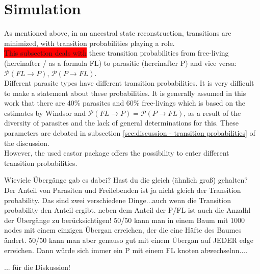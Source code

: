   \section{Simulation} \label{sec:discussion - simulation}

  As mentioned above, in an ancestral state reconstruction, transitions are minimized, with 
  transition probabilities playing a role. \\
\colorbox{red}{This subsection deals with} these transition probabilities from free-living (hereinafter / as a 
  formula FL) to parasitic (hereinafter P) and vice versa: $\mathcal{P}(FL \rightarrow P)$, 
  $\mathcal{P}(P \rightarrow FL)$. \\
Different parasite types have different transition probabilities. It is very difficult to make a 
  statement about these probabilities. It is generally assumed in this work that there are 40\% 
  parasites and 60\% free-livings which is based on the estimates by Windsor \cite{Windsor1998} 
  and $\mathcal{P}(FL \rightarrow P) = \mathcal{P}(P \rightarrow FL)$, as a result of the 
  diversity of parasites and the lack of general determinations for this. These parameters are 
  debated in subsection \ref{sec:discussion - transition probabilities} of the discussion. \\

  However, the used castor package \cite{Louca2017} offers the possibility to enter different 
  transition probabilities.

  Wieviele Übergänge gab es dabei? Hast du die gleich (ähnlich groß) gehalten?
  Der Anteil von Parasiten und Freilebenden ist ja nicht gleich der Transition probability. Das sind zwei verschiedene Dinge...auch wenn die Transition probability den Anteil ergibt. 
  neben dem Anteil der P/FL ist auch die Anzalhl der Übergänge zu berücksichtigen!
  50/50 kann man in einem Baum mit 1000 nodes mit einem einzigen Übergan erreichen, der die eine Häfte des Baumes ändert.
  50/50 kann man aber genauso gut mit einem Übergan auf JEDER edge erreichen. Dann würde sich immer ein P mit einem FL knoten abwechselnn....

... für die Diskussion!

\todo{-----}

